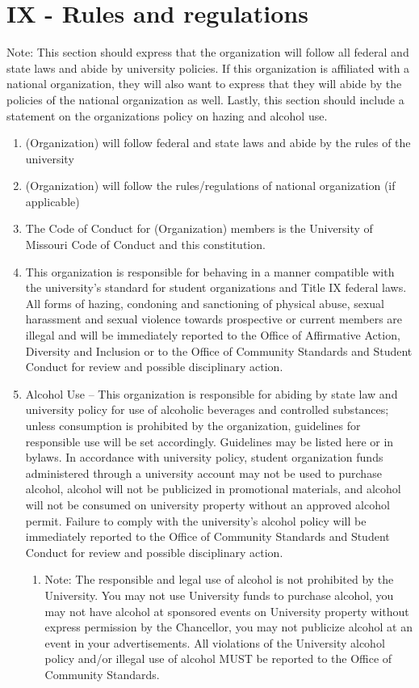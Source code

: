 
\section{IX - Rules and regulations}
Note:  This section should express that the organization will follow all federal
and state laws and abide by university policies.  If this organization is
affiliated with a national organization, they will also want to express that
they will abide by the policies of the national organization as well.  Lastly,
this section should include a statement on the organizations policy on hazing
and alcohol use.
\begin{enumerate}
\item (Organization) will follow federal and state laws and abide by the rules
of the university
\item (Organization) will follow the rules/regulations of national organization
(if applicable)
\item The Code of Conduct for (Organization) members is the University of
Missouri Code of Conduct and this constitution.
\item This organization is responsible for behaving in a manner compatible with
the university’s standard for student organizations and Title IX federal laws.
All forms of hazing, condoning and sanctioning of physical abuse, sexual
harassment and sexual violence towards prospective or current members are
illegal and will be immediately reported to the Office of Affirmative Action,
Diversity and Inclusion or to the Office of Community Standards and Student
Conduct for review and possible disciplinary action.
\item Alcohol Use – This organization is responsible for abiding by state law
and university policy for use of alcoholic beverages and controlled substances;
unless consumption is prohibited by the organization, guidelines for responsible
use will be set accordingly. {Guidelines may be listed here or in bylaws}. In
accordance with university policy, student organization funds administered
through a university account may not be used to purchase alcohol, alcohol will
not be publicized in promotional materials, and alcohol will not be consumed on
university property without an approved alcohol permit. Failure to comply with
the university’s alcohol policy will be immediately reported to the Office of
Community Standards and Student Conduct for review and possible disciplinary
action.
  \begin{enumerate}
    \item Note: The responsible and legal use of alcohol is not prohibited by
    the University. You may not use University funds to purchase alcohol, you
    may not have alcohol at sponsored events on University property without
    express permission by the Chancellor, you may not publicize alcohol at an
    event in your advertisements. All violations of the University alcohol
    policy and/or illegal use of alcohol MUST be reported to the Office of
    Community Standards. 
  \end{enumerate}
\end{enumerate}

